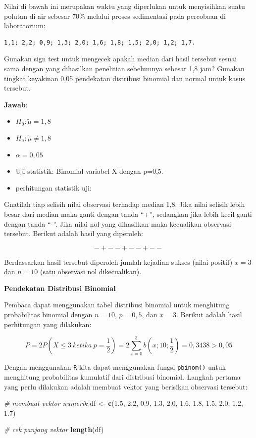 \documentclass[]{book}
\newenvironment{Shaded}{\begin{snugshade}}{\end{snugshade}}
\newcommand{\KeywordTok}[1]{\textcolor[rgb]{0.13,0.29,0.53}{\textbf{#1}}}
\newcommand{\FloatTok}[1]{\textcolor[rgb]{0.00,0.00,0.81}{#1}}
\newcommand{\StringTok}[1]{\textcolor[rgb]{0.31,0.60,0.02}{#1}}
\newcommand{\CommentTok}[1]{\textcolor[rgb]{0.56,0.35,0.01}{\textit{#1}}}
\newcommand{\NormalTok}[1]{#1}
\providecommand{\tightlist}{%
  \setlength{\itemsep}{0pt}\setlength{\parskip}{0pt}}
\begin{document}
Nilai di bawah ini merupakan waktu yang diperlukan untuk menyisihkan
suatu polutan di air sebesar 70\% melalui proses sedimentasi pada
percobaan di laboratorium:

\begin{verbatim}
1,1; 2,2; 0,9; 1,3; 2,0; 1,6; 1,8; 1,5; 2,0; 1,2; 1,7.
\end{verbatim}

Gunakan sign test untuk mengecek apakah median dari hasil tersebut
sesuai sama dengan yang dihasilkan penelitian sebelumnya sebesar 1,8
jam? Gunakan tingkat keyakinan 0,05 pendekatan distribusi binomial dan
normal untuk kasus tersebut.

\textbf{Jawab}:

\begin{itemize}
\tightlist
\item
  \(H_0:\tilde{\mu}=1,8\)
\item
  \(H_a:\tilde{\mu}\ne1,8\)
\item
  \(\alpha=0,05\)
\item
  Uji statistik: Binomial variabel X dengan p=0,5.
\item
  perhitungan statistik uji:
\end{itemize}

Gnatilah tiap selisih nilai observasi terhadap median 1,8. Jika nilai
selisih lebih besar dari median maka ganti dengan tanda ``+'', sedangkan
jika lebih kecil ganti dengan tanda ``-''. Jika nilai nol yang
dihasilkan maka kecualikan observasi tersebut. Berikut adalah hasil yang
diperoleh:

\[
- + - - + - - + - -
\]

Berdassarkan hasil tersebut diperoleh jumlah kejadian sukses (nilai
positif) \(x=3\) dan \(n=10\) (satu observasi nol dikecualikan).

\textbf{Pendekatan Distribusi Binomial}

Pembaca dapat menggunakan tabel distribusi binomial untuk menghitung
probabilitas binomial dengan \(n=10\), \(p=0,5\), dan \(x=3\). Berikut
adalah hasil perhitungan yang dilakukan:

\[
P=2P\left(X\le3\ ketika\ p=\frac{1}{2}\right)=2\sum_{x=0}^3b\left(x;10;\frac{1}{2}\right)=0,3438>0,05
\]

Dengan menggunakan \texttt{R} kita dapat menggunakan fungsi
\texttt{pbinom()} untuk menghitung probabilitas kumulatif dari
distribusi binomial. Langkah pertama yang perlu dilakukan adalah membuat
vektor yang berisikan observasi tersebut:

\begin{Shaded}
\begin{Highlighting}[]
\CommentTok{# membuat vektor numerik}
\NormalTok{df <-}\StringTok{ }\KeywordTok{c}\NormalTok{(}\FloatTok{1.5}\NormalTok{, }\FloatTok{2.2}\NormalTok{, }\FloatTok{0.9}\NormalTok{, }\FloatTok{1.3}\NormalTok{, }\FloatTok{2.0}\NormalTok{, }
        \FloatTok{1.6}\NormalTok{, }\FloatTok{1.8}\NormalTok{, }\FloatTok{1.5}\NormalTok{, }\FloatTok{2.0}\NormalTok{, }\FloatTok{1.2}\NormalTok{, }\FloatTok{1.7}\NormalTok{)}

\CommentTok{# cek panjang vektor}
\KeywordTok{length}\NormalTok{(df)}
\end{Highlighting}
\end{Shaded}
\end{document}
